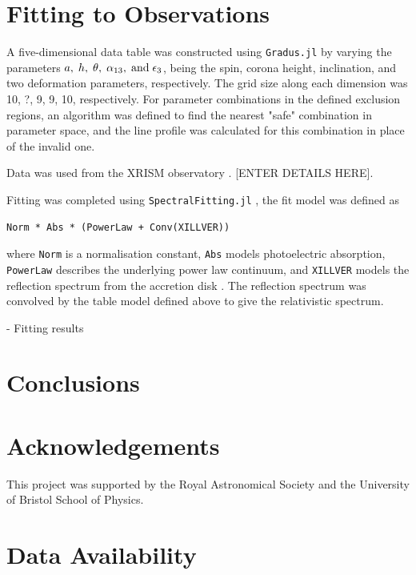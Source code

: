 \documentclass[fleqn,usenatbib]{mnras}
\begin{document}
\section{Fitting to Observations}

A five-dimensional data table was constructed using \verb|Gradus.jl| by varying the parameters $a,\;h,\;\theta,\;\alpha_{13},\;{\rm and}\;\epsilon_{3}$, being the spin, corona height, inclination, and two deformation parameters, respectively. The grid size along each dimension was 10, ?, 9, 9, 10, respectively. For parameter combinations in the defined exclusion regions, an algorithm was defined to find the nearest "safe" combination in parameter space, and the line profile was calculated for this combination in place of the invalid one.

Data was used from the XRISM observatory \cite{xrism_science_team_science_2020}. [ENTER DETAILS HERE].

Fitting was completed using \verb|SpectralFitting.jl|  \cite{baker_spectralfittingjl_2025}, the fit model was defined as
\begin{verbatim}
Norm * Abs * (PowerLaw + Conv(XILLVER))
\end{verbatim}
where \verb|Norm| is a normalisation constant, \verb|Abs| models photoelectric absorption, \verb|PowerLaw| describes the underlying power law continuum, and \verb|XILLVER| models the reflection spectrum from the accretion disk \cite{garcia_x-ray_2010,garcia_x-ray_2013,garcia_improved_2014}. The reflection spectrum was convolved by the table model defined above to give the relativistic spectrum.

- Fitting results

\section{Conclusions}



\section*{Acknowledgements}

This project was supported by the Royal Astronomical Society and the University of Bristol School of Physics.

\section*{Data Availability}








\bsp	%
\label{lastpage}
\end{document}
